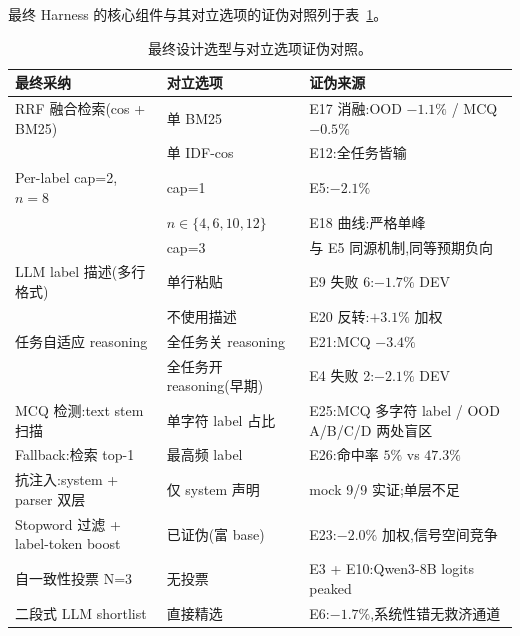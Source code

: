 \documentclass[11pt,a4paper]{ctexart}
\begin{document}
最终 Harness 的核心组件与其对立选项的证伪对照列于表~\ref{tab:design-choice}。

\begin{table}[h]
\centering
\small
\renewcommand{\arraystretch}{1.25}
\begin{tabularx}{\linewidth}{@{}>{\raggedright\arraybackslash}p{4.2cm}>{\raggedright\arraybackslash}p{3.5cm}X@{}}
\toprule
\textbf{最终采纳} & \textbf{对立选项} & \textbf{证伪来源} \\
\midrule
RRF 融合检索(cos + BM25)            & 单 BM25               & E17 消融:OOD $-1.1\%$ / MCQ $-0.5\%$ \\
                                    & 单 IDF-cos            & E12:全任务皆输 \\
Per-label cap=2, $n=8$              & cap=1                 & E5:$-2.1\%$ \\
                                    & $n \in \{4,6,10,12\}$ & E18 曲线:严格单峰 \\
                                    & cap=3                 & 与 E5 同源机制,同等预期负向 \\
LLM label 描述(多行格式)            & 单行粘贴              & E9 失败 6:$-1.7\%$ DEV \\
                                    & 不使用描述            & E20 反转:$+3.1\%$ 加权 \\
任务自适应 reasoning                & 全任务关 reasoning    & E21:MCQ $-3.4\%$ \\
                                    & 全任务开 reasoning(早期) & E4 失败 2:$-2.1\%$ DEV \\
MCQ 检测:text stem 扫描            & 单字符 label 占比     & E25:MCQ 多字符 label / OOD A/B/C/D 两处盲区 \\
Fallback:检索 top-1                & 最高频 label          & E26:命中率 $5\%$ vs $47.3\%$ \\
抗注入:system + parser 双层        & 仅 system 声明        & mock 9/9 实证;单层不足 \\
Stopword 过滤 + label-token boost   & 已证伪(富 base)      & E23:$-2.0\%$ 加权,信号空间竞争 \\
自一致性投票 N=3                    & 无投票                & E3 + E10:Qwen3-8B logits peaked \\
二段式 LLM shortlist                & 直接精选              & E6:$-1.7\%$,系统性错无救济通道 \\
\bottomrule
\end{tabularx}
\caption{最终设计选型与对立选项证伪对照。}
\label{tab:design-choice}
\end{table}
\end{document}

